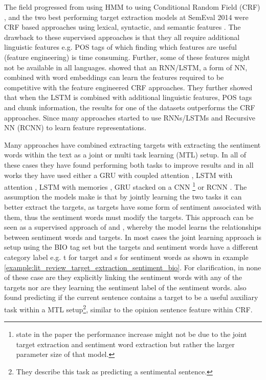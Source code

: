 The field progressed from using HMM to using Conditional Random Field (CRF) \citep{lafferty2001conditional}, and the two best performing target extraction models at SemEval 2014 \citep{pontiki-etal-2014-semeval} were CRF based approaches using lexical, syntactic, and semantic features \citep{chernyshevich-2014-ihs, toh-wang-2014-dlirec}. The drawback to these supervised approaches is that they all require additional linguistic features e.g. POS tags of which finding which features are useful (feature engineering) is time consuming. Further, some of these features might not be available in all languages. \citet{liu-etal-2015-fine} showed that an RNN/LSTM, a form of NN, combined with word embeddings can learn the features required to be competitive with the feature engineered CRF approaches. They further showed that when the LSTM is combined with additional linguistic features, POS tags and chunk information, the results for one of the datasets outperforms the CRF approaches. Since \citet{liu-etal-2015-fine} many approaches started to use RNNs/LSTMs and Recursive NN (RCNN) to learn feature representations. 

Many approaches have combined extracting targets with extracting the sentiment words within the text as a joint or multi task learning (MTL) setup. In all of these cases they have found performing both tasks to improve results and in all works they have used either a GRU with coupled attention \citep{wang2017coupled}, LSTM with attention \citep{li2018aspect}, LSTM with memories \citep{li-lam-2017-deep}, GRU stacked on a CNN \citep{jebbara2016aspect}\footnote{\citet{jebbara2016aspect} state in the paper the performance increase might not be due to the joint target extraction and sentiment word extraction but rather the larger parameter size of that model.} or RCNN \citep{wang-etal-2016-recursive}. The assumption the models make is that by jointly learning the two tasks it can better extract the targets, as targets have some form of sentiment associated with them, thus the sentiment words must modify the targets. This approach can be seen as a supervised approach of \citet{qiu-etal-2011-opinion} and \citet{hu2004mining_target_terms}, whereby the model learns the relationships between sentiment words and targets. In most cases the joint learning approach is setup using the BIO tag set but the targets and sentiment words have a different category label e.g. t for target and s for sentiment words as shown in example \ref{example:lit_review_target_extraction_sentiment_bio}. For clarification, in none of these case are they explicitly linking the sentiment words with any of the targets nor are they learning the sentiment label of the sentiment words. \citet{li-lam-2017-deep} also found predicting if the current sentence contains a target to be a useful auxiliary task within a MTL setup\footnote{They describe this task as predicting a sentimental sentence.}, similar to the opinion sentence feature within \citet{jakob-gurevych-2010-extracting} CRF.

